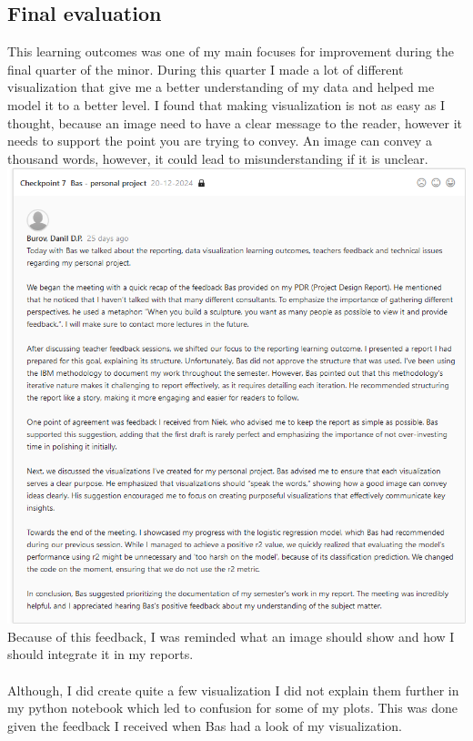 \documentclass{article}
\begin{document}
\subsection{Final evaluation}
This learning outcomes was one of my main focuses for improvement during the final quarter of the minor. During this quarter I made a lot of different visualization that give me a better understanding of my data and helped me model it to a better level. I found that making visualization is not as easy as I thought, because an image need to have a clear message to the reader, however it needs to support the point you are trying to convey. An image can convey a thousand words, however, it could lead to misunderstanding if it is unclear.
\includegraphics[width=\textwidth,keepaspectratio]{images/Feedback_Bas_3.png}\\
Because of this feedback, I was reminded what an image should show and how I should integrate it in my reports.\\\\
Although, I did create quite a few visualization I did not explain them further in my python notebook which led to confusion for some of my plots. This was done given the feedback I received when Bas had a look of my visualization.
\end{document}
